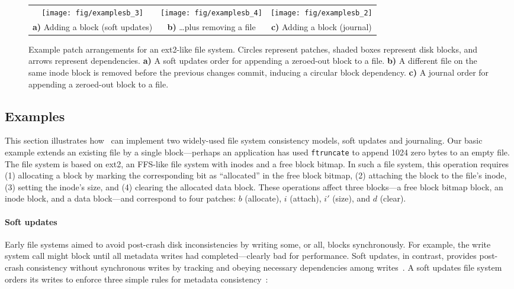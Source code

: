 \begin{figure*}[t]
\centering
\begin{tabular}{@{}cc@{\qquad\qquad}c@{}}
\texttt{[image: fig/examplesb\_3]}
& \texttt{[image: fig/examplesb\_4]}
& \texttt{[image: fig/examplesb\_2]} \\
\textbf{a)} Adding a block (soft updates)
& \textbf{b)} \dots plus removing a file
& \textbf{c)} Adding a block (journal) \\
\end{tabular}
\caption{Example patch arrangements for an ext2-like file system.
 Circles represent patches, shaded boxes represent disk blocks, and arrows
 represent dependencies.
 \textbf{a)} A soft updates order for appending a zeroed-out block to
 a file.  \textbf{b)} A different file on the same inode block is removed
 before the previous changes commit, inducing a circular block dependency.
 \textbf{c)} A journal order for appending a zeroed-out block to a
 file.}
\label{f:ex}
\end{figure*}


\subsection{Examples}
\label{sec:patch:examples}

This section illustrates how \patches\ can implement two widely-used
 file system consistency models, soft updates and journaling.
%
Our basic example extends an existing file by a single block---perhaps an
 application has used \texttt{ftruncate} to append 1024 zero bytes to an
 empty file.
%
The file system is based on ext2, an FFS-like file system with inodes and
 a free block bitmap.
%
In such a file system, this operation requires (1) allocating a block by
 marking the corresponding bit as ``allocated'' in the free block bitmap,
 (2) attaching the block to the file's inode, (3) setting the inode's size,
 and (4) clearing the allocated data block.
%
These operations affect three blocks---a free block bitmap block, an inode
 block, and a data block---and correspond to four patches: $b$ (allocate),
 $i$ (attach), $i'$ (size), and $d$ (clear).


\paragraph{Soft updates}
%
Early file systems aimed to avoid post-crash disk inconsistencies by
 writing some, or all, blocks synchronously.
%
For example, the write system call might block until all metadata writes
 had completed---clearly bad for performance.
%
Soft updates, in contrast, provides post-crash consistency without
 synchronous writes by tracking and obeying necessary dependencies among
 writes~\cite{ganger00soft}.
%
A soft updates file system orders its writes to enforce three simple rules
 for metadata consistency~\cite{ganger00soft}:

